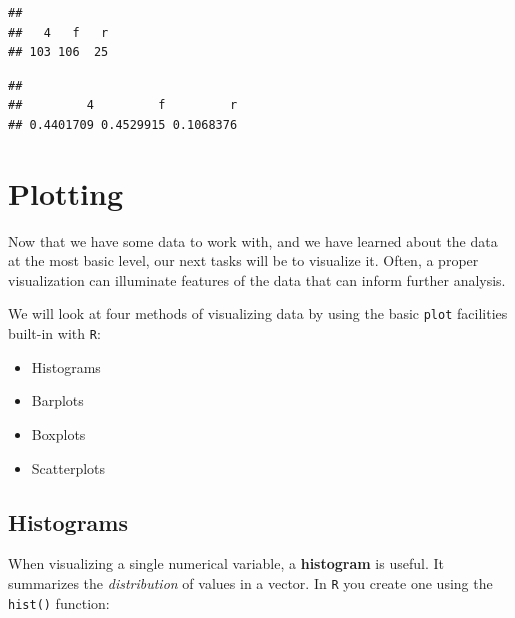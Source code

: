 \documentclass[]{book}
\newenvironment{Shaded}{\begin{snugshade}}{\end{snugshade}}
\newcommand{\KeywordTok}[1]{\textcolor[rgb]{0.13,0.29,0.53}{\textbf{#1}}}
\newcommand{\StringTok}[1]{\textcolor[rgb]{0.31,0.60,0.02}{#1}}
\newcommand{\OperatorTok}[1]{\textcolor[rgb]{0.81,0.36,0.00}{\textbf{#1}}}
\newcommand{\NormalTok}[1]{#1}
\providecommand{\tightlist}{%
  \setlength{\itemsep}{0pt}\setlength{\parskip}{0pt}}
\begin{document}
\begin{Shaded}
\end{Shaded}

\begin{verbatim}
## 
##   4   f   r 
## 103 106  25
\end{verbatim}

\begin{Shaded}
\end{Shaded}

\begin{verbatim}
## 
##         4         f         r 
## 0.4401709 0.4529915 0.1068376
\end{verbatim}

\section{Plotting}\label{plotting}

Now that we have some data to work with, and we have learned about the
data at the most basic level, our next tasks will be to visualize it.
Often, a proper visualization can illuminate features of the data that
can inform further analysis.

We will look at four methods of visualizing data by using the basic
\texttt{plot} facilities built-in with \texttt{R}:

\begin{itemize}
\tightlist
\item
  Histograms
\item
  Barplots
\item
  Boxplots
\item
  Scatterplots
\end{itemize}

\subsection{Histograms}\label{histograms}

When visualizing a single numerical variable, a \textbf{histogram} is
useful. It summarizes the \emph{distribution} of values in a vector. In
\texttt{R} you create one using the \texttt{hist()} function:
\end{document}
